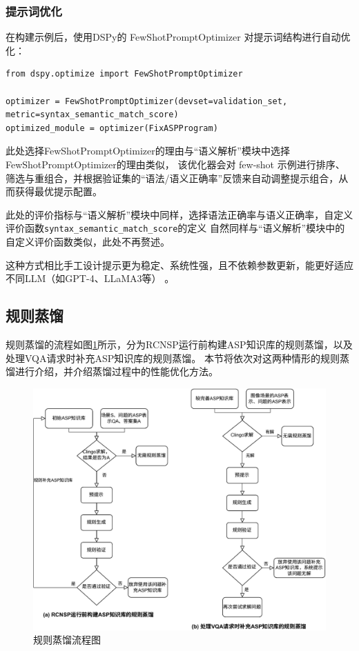 \subsubsection{提示词优化}
在构建示例后，使用DSPy的 FewShotPromptOptimizer 对提示词结构进行自动优化：
\begin{lstlisting}
from dspy.optimize import FewShotPromptOptimizer

optimizer = FewShotPromptOptimizer(devset=validation_set, metric=syntax_semantic_match_score)
optimized_module = optimizer(FixASPProgram)
\end{lstlisting}
此处选择FewShotPromptOptimizer的理由与“语义解析”模块中选择FewShotPromptOptimizer的理由类似，
该优化器会对 few-shot 示例进行排序、筛选与重组合，并根据验证集的“语法/语义正确率”反馈来自动调整提示组合，从而获得最优提示配置。

此处的评价指标与“语义解析”模块中同样，选择语法正确率与语义正确率，自定义评价函数\texttt{syntax\_semantic\_match\_score}的定义
自然同样与“语义解析”模块中的自定义评价函数类似，此处不再赘述。

这种方式相比手工设计提示更为稳定、系统性强，且不依赖参数更新，能更好适应不同LLM（如GPT-4、LLaMA3等） 。

\subsection{规则蒸馏}
规则蒸馏的流程如图\ref{distill-process}所示，分为RCNSP运行前构建ASP知识库的规则蒸馏，以及处理VQA请求时补充ASP知识库的规则蒸馏。
本节将依次对这两种情形的规则蒸馏进行介绍，并介绍蒸馏过程中的性能优化方法。
\begin{figure}[h]
    \centering
    \includegraphics[scale=0.9]{figures/distillation.drawio-crop.pdf}
    \caption{规则蒸馏流程图}
    \label{distill-process}
\end{figure}
